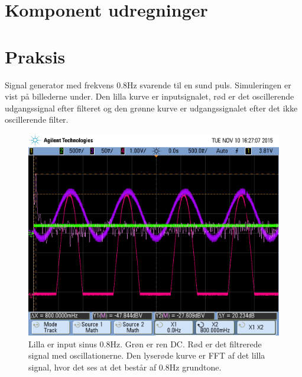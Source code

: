 \section{Komponent udregninger}


\section{Praksis}
Signal generator med frekvens 0.8Hz svarende til en sund puls. Simuleringen er vist på billederne under. Den lilla kurve er inputsignalet, rød er det oscillerende udgangssignal efter filteret og den grønne kurve er udgangssignalet efter det ikke oscillerende filter.

\begin{figure}[H]
	\includegraphics[width=\textwidth]{billeder/scope_9.png}
	\caption{Lilla er input sinus 0.8Hz. Grøn er ren DC. Rød er det filtrerede signal med oscillationerne. Den lyserøde kurve er FFT af det lilla signal, hvor det ses at det består af 0.8Hz grundtone.}\label{fig:filterone}
\end{figure}

